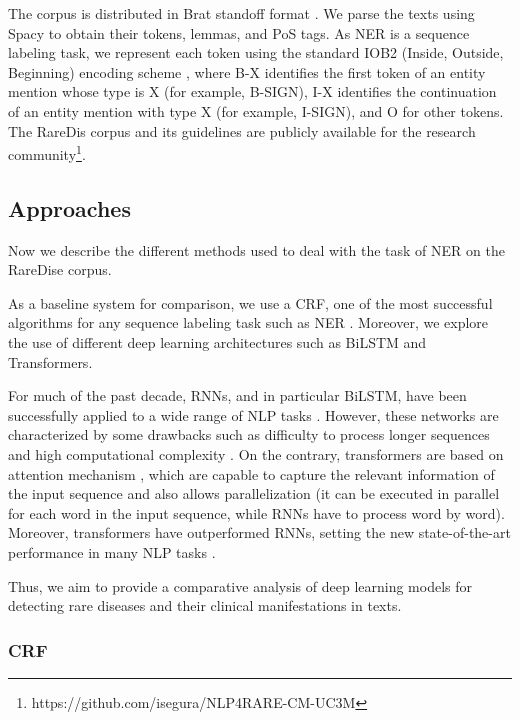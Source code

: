 \documentclass[preprint,12pt]{elsarticle}
\begin{document}
    
The corpus is distributed in Brat standoff format  \cite{stenetorp2012brat}. We parse the texts using Spacy to obtain their tokens, lemmas, and PoS tags. As NER is a  sequence labeling task, we represent each token using the standard IOB2 (Inside, Outside, Beginning) encoding scheme  \cite{tjong-kim-sang-veenstra-1999-representing}, where  
 B-X identifies the first token of an entity mention whose type is X (for example, B-SIGN), I-X identifies the continuation of an entity mention with type X (for example, I-SIGN), and O for other tokens. 
 The RareDis corpus and its guidelines are publicly available for the research community\footnote{https://github.com/isegura/NLP4RARE-CM-UC3M}. 
 



\subsection{Approaches}

Now we describe the different methods used to deal with the task of NER on the RareDise corpus. 

As a baseline system for comparison, we use a CRF, one of the most successful algorithms for any sequence labeling task such as NER \cite{nguyen2007comparisons,li2020survey}.
Moreover, we explore the use of different deep learning architectures such as BiLSTM and Transformers. 

For much of the past decade, RNNs, and in particular BiLSTM, have been successfully applied to a wide range of NLP tasks \cite{peters-etal-2018-deep,DBLP:conf/coling/ZhouQZXBX16}. However, these networks are characterized by some drawbacks such as difficulty to process longer sequences and high computational complexity \cite{vzukov2018named}. On the contrary, transformers are based on attention mechanism \cite{luong-etal-2015-effective}, which are capable to capture the relevant information of the input sequence and also allows parallelization (it can be executed in parallel for each word in the input sequence, while RNNs have to process word by word). 
Moreover, transformers have outperformed RNNs, setting the new state-of-the-art performance in many NLP tasks \cite{wolf-etal-2020-transformers}.

Thus, we aim to provide a comparative analysis of deep learning models for detecting rare diseases and their clinical manifestations in texts. 


\subsubsection{CRF}
\end{document}

